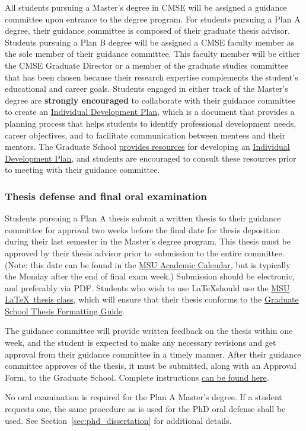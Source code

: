 All students pursuing a Master's degree in CMSE will be assigned a
guidance committee upon entrance to the degree program.  For students
pursuing a Plan A degree, their guidance committee is composed of
their graduate thesis advisor.  Students pursuing a Plan B degree will
be assigned a CMSE faculty member as the sole member of their guidance
committee.  This faculty member will be either the CMSE Graduate
Director or a member of the graduate studies committee that has been
chosen because their research expertise complements the student's
educational and career goals.  Students
engaged in either track of the Master's degree are \textbf{strongly encouraged}
to collaborate with their guidance committee to create an
\href{http://caffe.grd.msu.edu/IDP}{Individual Development Plan},
which is a document that provides a planning process that helps
students to identify professional development needs, career
objectives, and to facilitate communication between mentees and their
mentors.  The Graduate School
\href{https://grad.msu.edu/prep}{provides resources} for developing an
\href{http://caffe.grd.msu.edu/IDP}{Individual Development Plan}, and
students are encouraged to consult these resources prior to meeting
with their guidance committee.

\subsubsection{Thesis defense and final oral examination}

Students pursuing a Plan A thesis submit a written thesis to their
guidance committee for approval two weeks before the final date for
thesis deposition during their last semester in the Master's degree
program.  This thesis must  be approved by their thesis advisor prior
to submission to the entire committee.  (Note: this date can be found in the
\href{https://reg.msu.edu/ROInfo/Calendar/Academic.aspx}{MSU Academic
Calendar}, but is typically the Monday after the end of final exam
week.)  Submission should be electronic, and preferably via PDF.
Students who wish to use \LaTeX should use the
\href{http://ctan.org/pkg/msu-thesis}{MSU \LaTeX\ thesis class}, which
will ensure that their thesis conforms to the
\href{https://grad.msu.edu/etd/formatting-guide}{Graduate School
Thesis Formatting Guide}.

The guidance committee will provide written feedback on the thesis within one
week, and the student is expected to make any necessary revisions and
get approval from their guidance committee in a timely manner.  After
their guidance committee approves of the thesis, it must be submitted,
along with an Approval Form, to the Graduate School.  Complete
instructions \href{https://grad.msu.edu/etd}{can be found here}.

No oral examination is required for the Plan A Master's degree.  If a
student requests one, the same procedure as is used for the PhD oral
defense shall be used.  See Section~\ref{sec:phd_dissertation} for
additional details.